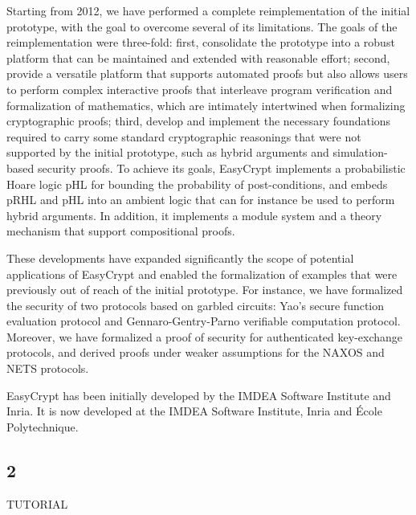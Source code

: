 \documentclass[runningheads,a4paper]{llncs}
\begin{document}
Starting from 2012, we have performed a complete reimplementation of the initial prototype, with the goal to overcome several of its limitations. The goals of the reimplementation were three-fold: first, consolidate the prototype into a robust platform that can be maintained and extended with reasonable effort; second, provide a versatile platform that supports automated proofs but also allows users to perform complex interactive proofs that interleave program verification and formalization of mathematics, which are intimately intertwined when formalizing cryptographic proofs; third, develop and implement the necessary foundations required to carry some standard cryptographic reasonings that were not supported by the initial prototype, such as hybrid arguments and simulation-based security proofs. To achieve its goals, EasyCrypt implements a probabilistic Hoare logic pHL for bounding the probability of post-conditions, and embeds pRHL and pHL into an ambient logic that can for instance be used to perform hybrid arguments. In addition, it implements a module system and a theory mechanism that support compositional proofs.

These developments have expanded significantly the scope of potential applications of EasyCrypt and enabled the formalization of examples that were previously out of reach of the initial prototype. For instance, we have formalized the security of two protocols based on garbled circuits: Yao's secure function evaluation protocol and Gennaro-Gentry-Parno verifiable computation protocol. Moreover, we have formalized a proof of security for authenticated key-exchange protocols, and derived proofs under weaker assumptions for the NAXOS and NETS protocols.

EasyCrypt has been initially developed by the IMDEA Software Institute and Inria. It is now developed at the IMDEA Software Institute, Inria and École Polytechnique.


\subsection{2}

TUTORIAL
\end{document}
